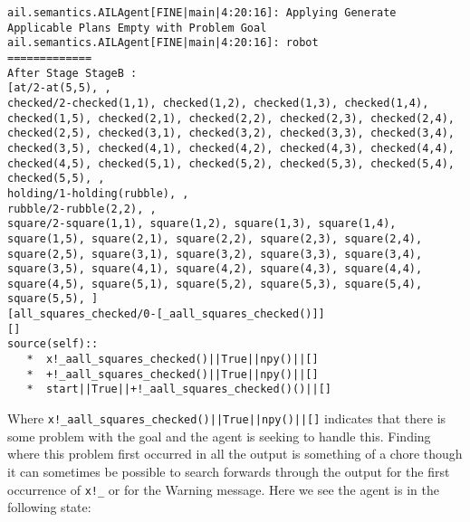 \begin{verbatim}
ail.semantics.AILAgent[FINE|main|4:20:16]: Applying Generate Applicable Plans Empty with Problem Goal 
ail.semantics.AILAgent[FINE|main|4:20:16]: robot
=============
After Stage StageB :
[at/2-at(5,5), , 
checked/2-checked(1,1), checked(1,2), checked(1,3), checked(1,4), checked(1,5), checked(2,1), checked(2,2), checked(2,3), checked(2,4), checked(2,5), checked(3,1), checked(3,2), checked(3,3), checked(3,4), checked(3,5), checked(4,1), checked(4,2), checked(4,3), checked(4,4), checked(4,5), checked(5,1), checked(5,2), checked(5,3), checked(5,4), checked(5,5), , 
holding/1-holding(rubble), , 
rubble/2-rubble(2,2), , 
square/2-square(1,1), square(1,2), square(1,3), square(1,4), square(1,5), square(2,1), square(2,2), square(2,3), square(2,4), square(2,5), square(3,1), square(3,2), square(3,3), square(3,4), square(3,5), square(4,1), square(4,2), square(4,3), square(4,4), square(4,5), square(5,1), square(5,2), square(5,3), square(5,4), square(5,5), ]
[all_squares_checked/0-[_aall_squares_checked()]]
[]
source(self):: 
   *  x!_aall_squares_checked()||True||npy()||[]
   *  +!_aall_squares_checked()||True||npy()||[]
   *  start||True||+!_aall_squares_checked()()||[]
\end{verbatim}

\begin{sloppypar}
Where \texttt{x!\_aall\_squares\_checked()||True||npy()||[]} indicates
that there is some problem with the goal and the
agent is seeking to handle this.  Finding where this problem first
occurred in all the output is something of a chore though it can
sometimes be possible to search forwards through the output for the
first occurrence of \texttt{x!\_}  or for the Warning message.  Here
we see the agent is in the following state: 
\end{sloppypar}

